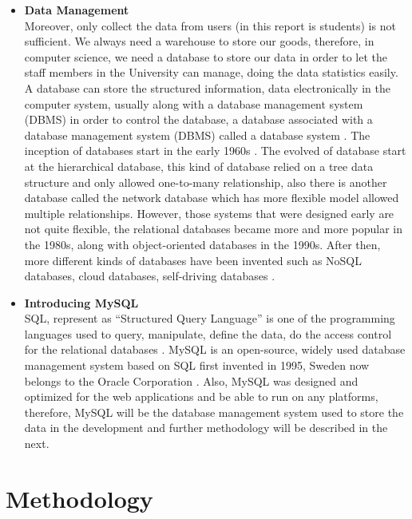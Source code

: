 \documentclass[12pt]{article}
\begin{document}
\begin{itemize}
\item\textbf{Data Management}
\\Moreover, only collect the data from users (in this report is students) is not sufficient. We always need a warehouse to store our goods, therefore, in computer science, we need a database to store our data in order to let the staff members in the University can manage, doing the data statistics easily. A database can store the structured information, data electronically in the computer system, usually along with a database management system (DBMS) in order to control the database, a database associated with a database management system (DBMS) called a database system \cite{hick2006database}. The inception of databases start in the early 1960s \cite{letkowski2015doing}. The evolved of database start at the hierarchical database, this kind of database relied on a tree data structure and only allowed one-to-many relationship, also there is another database called the network database which has more flexible model allowed multiple relationships. However, those systems that were designed early are not quite flexible, the relational databases became more and more popular in the 1980s, along with object-oriented databases in the 1990s. After then, more different kinds of databases have been invented such as NoSQL databases, cloud databases, self-driving databases \cite{olle2003database}.
\item\textbf{Introducing MySQL}
\\SQL, represent as ``Structured Query Language'' is one of the programming languages used to query, manipulate, define the data, do the access control for the relational databases \cite{beynon2004database}. MySQL is an open-source, widely used database management system based on SQL first invented in 1995, Sweden now belongs to the Oracle Corporation \cite{letkowski2015doing}. Also, MySQL was designed and optimized for the web applications and be able to run on any platforms, therefore, MySQL will be the database management system used to store the data in the development and further methodology will be described in the next.
\end{itemize}
\section{Methodology}
\end{document}

